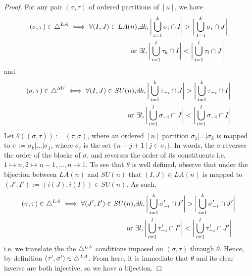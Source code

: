 \begin{proof}
For any pair $(\sigma,\tau)$ of ordered partitions of $[n]$, we have
\begin{align*}
    (\sigma,\tau)\in \triangle^{LA}
    \iff  \forall (I,J) \in LA(n), &\exists k, \bigg| \bigcup_{i=1}^k \sigma_i \cap I \bigg| > \bigg|\bigcup_{1=1}^k \sigma_i \cap J \bigg|
    \\
    \text{ or } 
    &\exists l, \bigg| \bigcup_{i=1}^l \tau_k \cap I \bigg| < \bigg|\bigcup_{i=1}^l \tau_l \cap J \bigg|
\end{align*}
and 
\begin{align*}
    (\sigma,\tau)\in \triangle^{SU}
    \iff  \forall (I,J) \in SU(n),
    &\exists k, \bigg| \bigcup_{i=1}^{k} \tau_{-i} \cap J \bigg| > \bigg|\bigcup_{i=1}^{k}\tau_{-i} \cap I \bigg|
    \\
    \text{ or } 
    &\exists l, \bigg| \bigcup_{i=1}^{l} \sigma_{-i} \cap J \bigg| < \bigg|\bigcup_{i=1}^{l} \sigma_{-i} \cap I \bigg|    
\end{align*}
Let $\theta ((\sigma,\tau)) := (\overline{\tau},\overline{\sigma})$, where an ordered $[n]$ partition $\sigma_1|...|\sigma_k$ is mapped to $\overline{\sigma}:=\overline{\sigma_{k}} | \ldots | \overline{\sigma_{1}}$, where $\overline{\sigma_i}$ is the set $\{n-j+1 \ | \ j \in \sigma_i\}$. In words, the $\overline{\sigma}$ reverses the order of the blocks of $\sigma$, and reverses the order of its constituents i.e. $1\mapsto n,2 \mapsto n-1,...,n\mapsto 1$. To see that $\theta$ is well defined, observe that under the bijection between $LA(n)$ and $SU(n)$ that $(I,J) \in LA(n)$ is mapped to $(J',I'):=(i(J),i(I)) \in SU(n)$. As such,
\begin{align*}
    (\sigma,\tau)\in \triangle^{LA}
    \iff  \forall (J',I') \in SU(n), 
    &\exists k, \bigg| \bigcup_{i=1}^{k} \sigma'_{-i} \cap I' \bigg| > \bigg|\bigcup_{i=1}^{k} \sigma'_{-i} \cap J' \bigg|
    \\
    \text{ or } 
    &\exists l, \bigg| \bigcup_{i=1}^{l} \tau'_{-i} \cap I' \bigg| < \bigg|\bigcup_{i=1}^{l} \tau'_{-i} \cap J' \bigg|
\end{align*}
i.e. we translate the the $\triangle^{LA}$ conditions imposed on $(\sigma,\tau)$ through $\theta$. Hence, by definition $(\tau',\sigma')\in \triangle^{LA}$. From here, it is immediate that $\theta$ and its clear inverse are both injective, so we have a bijection.
\end{proof}

